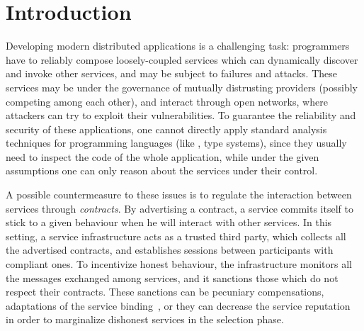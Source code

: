 \section{Introduction}


Developing modern distributed applications 
is a challenging task:
programmers have to reliably compose loosely-coupled services
which can dynamically discover and invoke other services,
and may be subject to failures and attacks.
These services may be under the governance of mutually distrusting providers 
(possibly competing among each other), 
and interact through open networks, %
where attackers can try to exploit their vulnerabilities. %
%
To guarantee the reliability and security of these applications,
one cannot directly apply standard analysis techniques for programming languages
(like \eg, type systems), 
since they usually need to inspect the code of the whole application,
while under the given assumptions one can only %
reason about the services under their control. %

A possible countermeasure to these issues is to regulate the interaction
between services through \emph{contracts}.
By advertising a contract, a service commits itself
to stick to a given behaviour when he will interact with other services.
In this setting, a service infrastructure acts as a trusted third party, 
which collects all the advertised contracts, and establishes sessions
between participants with compliant ones. %
To incentivize honest behaviour,
the infrastructure monitors all the messages exchanged among services,
and it sanctions those which do not respect their contracts.
These sanctions can be pecuniary compensations,
adaptations of the service binding~\cite{Mukhija2007qos},
or they can decrease the service reputation~\cite{CO2middleware}
in order to marginalize dishonest services in the selection phase.



